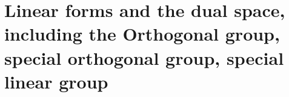 
\chapter{Linear forms and the dual space, including the Orthogonal group, special orthogonal group, special linear group}


